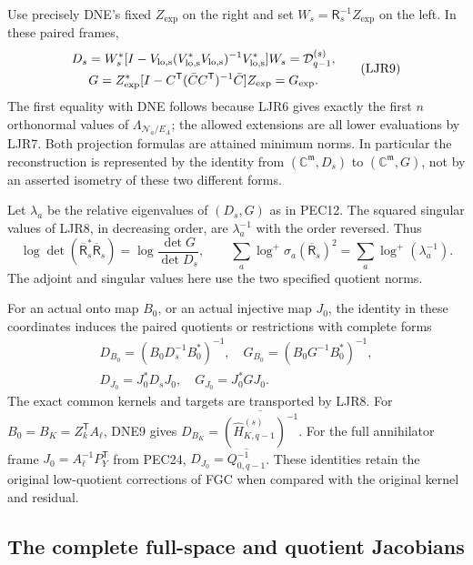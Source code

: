 \documentclass[11pt,a4paper]{article}
\begin{document}
Use precisely DNE's fixed $Z_{\exp}$ on the right and set
$W_s=\mathsf R_s^{-1}Z_{\exp}$ on the left. In these paired frames,
\[
 \begin{gathered}
 D_s=W_s^*[I-V_{\rm lo,s}(V_{\rm lo,s}^*V_{\rm lo,s})^{-1}
                          V_{\rm lo,s}^*]W_s
                =\mathcal D_{q-1}^{(s)},\\
 G=Z_{\exp}^*[I-C^{\mathsf T}(\bar C C^{\mathsf T})^{-1}
                          \bar C]Z_{\exp}=G_{\exp}.
 \end{gathered}\tag{LJR9}
\]
The first equality with DNE follows because LJR6 gives exactly
the first $n$ orthonormal values of
$\Lambda_{\mathcal N_a/E_A}$; the allowed extensions are all
lower evaluations by LJR7. Both projection formulas are attained
minimum norms. In particular the reconstruction is represented by
the identity from $(\mathbb C^{\mathfrak m},D_s)$ to
$(\mathbb C^{\mathfrak m},G)$, not by an asserted isometry of
these two different forms.

Let $\lambda_a$ be the relative eigenvalues of $(D_s,G)$ as
in PEC12. The squared singular values of LJR8, in decreasing
order, are $\lambda_a^{-1}$ with the order reversed. Thus
\[
 \log\det(\overline{\mathsf R}_s^*
                   \overline{\mathsf R}_s)
       =\log\frac{\det G}{\det D_s},\qquad
 \sum_a\log^+\sigma_a(\overline{\mathsf R}_s)^2
       =\sum_a\log^+(\lambda_a^{-1}).
 \tag{LJR10}
\]
The adjoint and singular values here use the two specified
quotient norms.

For an actual onto map $B_0$, or an actual injective map $J_0$,
the identity in these coordinates induces the paired quotients
or restrictions with complete forms
\[
 \begin{gathered}
 D_{B_0}=(B_0D_s^{-1}B_0^*)^{-1},\quad
 G_{B_0}=(B_0G^{-1}B_0^*)^{-1},\\
 D_{J_0}=J_0^*D_sJ_0,\quad G_{J_0}=J_0^*GJ_0.
 \end{gathered}\tag{LJR11}
\]
The exact common kernels and targets are transported by LJR8.
For $B_0=B_K=Z_k^{\mathsf T}A_\ell$, DNE9 gives
$D_{B_K}=\overline{(\widehat H_{K,q-1}^{(s)})^{-1}}$.
For the full annihilator frame $J_0=A_\ell^{-1}P_Y^{\mathsf T}$
from PEC24, $D_{J_0}=\overline{Q_{0,q-1}^{-1}}$.
These identities retain the original low-quotient corrections
of FGC when compared with the original kernel and residual.

\subsection{The complete full-space and quotient Jacobians}
\end{document}
